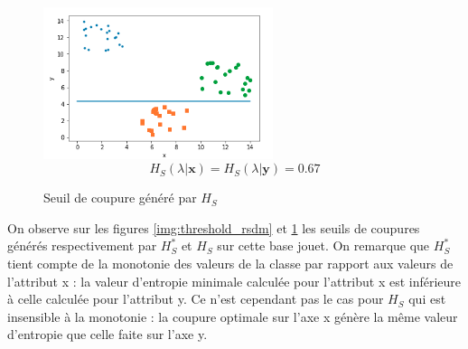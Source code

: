 \documentclass[a4paper]{article}
\begin{document}
\begin{figure}[H]
	\center 
	\includegraphics[width=0.6\textwidth]{images/threshold_sdm.png}
    $$H_S(\lambda | \mathbf{x}) = H_S(\lambda | \mathbf{y}) =  0.67$$
    \caption{Seuil de coupure généré par $H_S$}
    \label{img:threshold_sdm}
\end{figure}

On observe sur les figures \ref{img:threshold_rsdm} et \ref{img:threshold_sdm}
les seuils de coupures générés respectivement par $H^*_S$ et $H_S$ sur cette
base jouet. On remarque que $H^*_S$ tient compte de la monotonie des valeurs de
la classe par rapport aux valeurs de l'attribut x : la valeur d'entropie
minimale calculée pour l'attribut x est inférieure à celle calculée pour
l'attribut y. Ce n'est cependant pas le cas pour $H_S$ qui est insensible à la
monotonie : la coupure optimale sur l'axe x génère la même valeur d'entropie que
celle faite sur l'axe y.


\printbibliography
\end{document}
